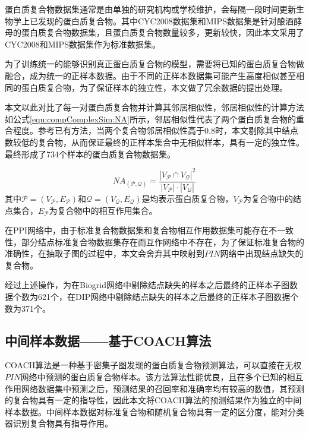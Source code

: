 蛋白质复合物数据集通常是由单独的研究机构或学校维护，会每隔一段时间更新生物学上已发现的蛋白质复合物。其中CYC2008数据集和MIPS数据集是针对酿酒酵母的蛋白质复合物数据集，且蛋白质复合物数量较多，更新较快，因此本文采用了CYC2008和MIPS数据集作为标准数据集。

为了训练统一的能够识别真正蛋白质复合物的模型，需要将已知的蛋白质复合物做融合，成为统一的正样本数据。由于不同的正样本数据集可能产生高度相似甚至相同的蛋白质复合物，为了保证样本的独立性，本文做了冗余数据的提出处理。

本文以此对比了每一对蛋白质复合物并计算其邻居相似性，邻居相似性的计算方法如公式\ref{equ:compComplexSim:NA}所示，邻居相似性代表了两个蛋白质复合物的重合程度。参考已有方法，当两个复合物邻居相似性高于0.8时，本文剔除其中结点数较低的复合物，从而保证最终的正样本集合中无相似样本，具有一定的独立性。最终形成了734个样本的蛋白质复合物数据集。

\begin{equation}
    \label{equ:compComplexSim:NA}
    NA_{(\mathcal{P} ,\mathcal{Q} )} = \frac{{\left\lvert V_{\mathcal{P}} \cap V_{\mathcal{Q}}\right\rvert}^2 }{{\left\lvert V_{\mathcal{P}} \right\rvert}\cdot  {\left\lvert V_{\mathcal{Q}} \right\rvert}}
\end{equation}
其中$\mathcal{P}=(V_{\mathcal{P}} ,E_{\mathcal{P}})$和$\mathcal{Q}=(V_{\mathcal{Q}} ,E_{\mathcal{Q}})$是均表示蛋白质复合物，$V_{\mathcal{P}}$为复合物中的结点集合，$E_{\mathcal{P}}$为复合物中的相互作用集合。

在PPI网络中，由于标准复合物数据集和复合物相互作用数据集可能存在不一致性，部分结点标准复合物数据集存在而互作网络中不存在，为了保证标准复合物的准确性，在抽取子图的过程中，本文会舍弃其中映射到$PIN$网络中出现结点缺失的复合物。

经过上述操作，为在Biogrid网络中剔除结点缺失的样本之后最终的正样本子图数据个数为621个，在DIP网络中剔除结点缺失的样本之后最终的正样本子图数据个数为371个。

\subsection{中间样本数据——基于COACH算法}
\label{subsection:allSample:middleSampleData}

COACH算法是一种基于密集子图发现的蛋白质复合物预测算法，可以直接在无权$PIN$网络中预测的蛋白质复合物样本。该方法算法性能优良，且在多个已知的相互作用网络数据集中预测之后，预测结果的召回率和准确率均有较高的数值，其预测的复合物具有一定的指导性，因此本文将COACH算法的预测结果作为独立的中间样本数据。中间样本数据对标准复合物和随机复合物具有一定的区分度，能对分类器识别复合物具有指导作用。

